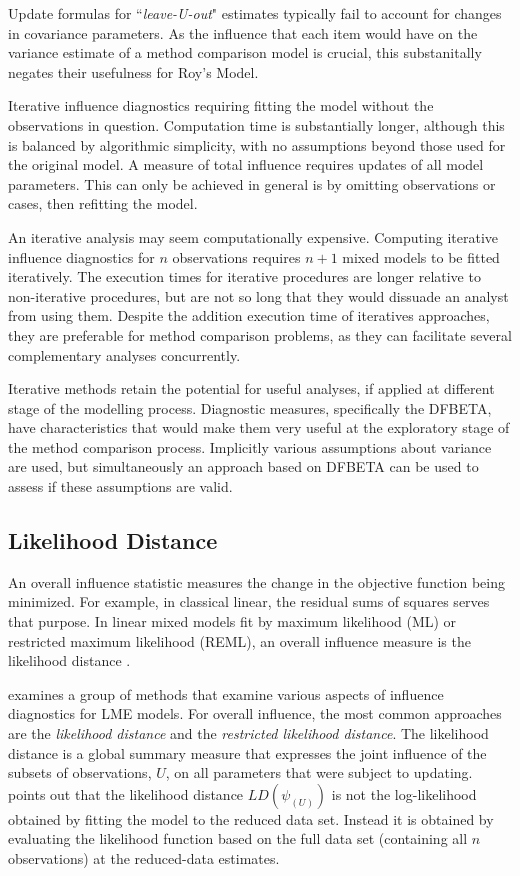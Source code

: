 \documentclass[12pt, a4paper]{report}
\theoremstyle{plain}
\theoremstyle{definition}
\theoremstyle{remark}
\begin{document}
	Update formulas for ``\textit{leave-U-out}" estimates typically fail to account for changes in covariance parameters.  As the influence that each item would have on the variance estimate of a method comparison model is crucial, this substanitally negates their usefulness for Roy's Model.
	
Iterative influence diagnostics requiring fitting the model without the observations in question. Computation time is substantially longer, although this is balanced by algorithmic simplicity, with no assumptions beyond those used for the original model. A measure of total influence requires updates of all model parameters. This can only be achieved in general is by omitting observations or cases, then refitting the model. 
	
	
An iterative analysis may seem computationally expensive. Computing iterative influence diagnostics for $n$ observations requires $n+1$ mixed models to be fitted iteratively.
	The execution times for iterative procedures are longer relative to non-iterative procedures, but are not so long that they would dissuade an analyst from using them.
	Despite the addition execution time of iteratives
	approaches, they are preferable for method comparison problems, as they can facilitate several complementary analyses concurrently. 
	
	
	Iterative methods retain the potential for useful analyses, if applied at different stage of the modelling process. Diagnostic measures, specifically the DFBETA, have characteristics that would make them very useful at the exploratory stage of the method comparison process. Implicitly various assumptions about variance are used, but simultaneously an approach based on DFBETA can be used to assess if these assumptions are valid.
	
	

	\subsection{Likelihood Distance}
	An overall influence statistic measures the change in the objective function being minimized. For example, in
	classical linear, the residual sums of squares serves that purpose. In linear mixed models fit by
	 maximum likelihood (ML) or  restricted maximum likelihood (REML), an overall influence measure is the  likelihood distance \citep{CookWeisberg}.
	
	\citet{west} examines a group of methods that examine various aspects of influence diagnostics for LME models. For overall influence, the most common approaches are the \textit{likelihood distance} and the \textit{restricted likelihood distance}.	
	The  likelihood distance is a global summary measure that expresses the joint influence of the subsets of observations, $U$, on all parameters that were subject to updating. \citet{schabenberger} points out that the likelihood distance $LD(\psi_{(U)})$ is not the log-likelihood obtained by fitting the model to the reduced data set. Instead it is obtained by evaluating the likelihood function based on the full data set (containing all $n$ observations) at the reduced-data estimates.
	
\end{document}
